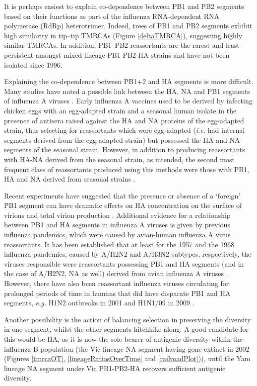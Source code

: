 \documentclass[11pt,oneside,letterpaper]{article}
\begin{document}
It is perhaps easiest to explain co-dependence between PB1 and PB2 segments based on their functions as part of the influenza RNA-dependent RNA polymerase (RdRp) heterotrimer.
Indeed, trees of PB1 and PB2 segments exhibit high similarity in tip--tip TMRCAs (Figure \ref{deltaTMRCA}), suggesting highly similar TMRCAs.
In addition, PB1--PB2 reassortants are the rarest and least persistent amongst mixed-lineage PB1-PB2-HA strains and have not been isolated since 1996.

Explaining the co-dependence between PB1+2 and HA segments is more difficult.
Many studies have noted a possible link between the HA, NA and PB1 segments of influenza A viruses \cite{bergeron2010,fulvini2011}.
Early influenza A vaccines used to be derived by infecting chicken eggs with an egg-adapted strain and a seasonal human isolate in the presence of antisera raised against the HA and NA proteins of the egg-adapted strain, thus selecting for reassortants which were egg-adapted (\textit{i.e.} had internal segments derived from the egg-adapted strain) but possessed the HA and NA segments of the seasonal strain.
However, in addition to producing reassortants with HA-NA derived from the seasonal strain, as intended, the second most frequent class of reassortants produced using this methods were those with PB1, HA and NA derived from seasonal strains \cite{bergeron2010,fulvini2011}.

Recent experiments have suggested that the presence or absence of a `foreign' PB1 segment can have dramatic effects on HA concentration on the surface of virions and total virion production \cite{cobbin2013}.
Additional evidence for a relationship between PB1 and HA segments in influenza A viruses is given by previous influenza pandemics, which were caused by avian-human influenza A virus reassortants.
It has been established that at least for the 1957 and the 1968 influenza pandemics, caused by A/H2N2 and A/H3N2 subtypes, respectively, the viruses responsible were reassortants possessing PB1 and HA segments (and in the case of A/H2N2, NA as well) derived from avian influenza A viruses \cite{kawaoka1989}.
However, there have also been reassortant influenza viruses circulating for prolonged periods of time in humans that did have disparate PB1 and HA segments, \textit{e.g.} H1N2 outbreaks in 2001 \cite{gregory2002} and H1N1/09 in 2009 \cite{smith2009}.

Another possibility is the action of balancing selection in preserving the diversity in one segment, whilst the other segments hitchhike along.
A good candidate for this would be HA, as it is now the sole bearer of antigenic diversity within the influenza B population (the Vic lineage NA segment having gone extinct in 2002 (Figures \ref{tmrcaOT}, \ref{lineageRatiosOverTime} and \ref{railroadPlot})), until the Yam lineage NA segment under Vic PB1-PB2-HA recovers sufficient antigenic diversity.
\end{document}
